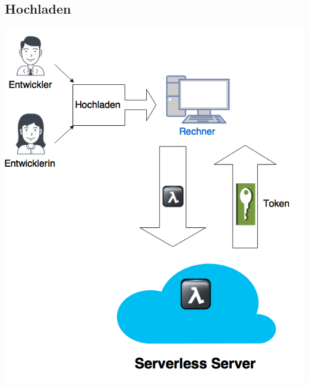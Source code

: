 \documentclass[a4paper,20pt,oneside]{book}
\begin{document}
\subsection{Hochladen}
\hspace{1cm}
\begin{center}
\includegraphics[width=13 cm]{Hochladen.png}
\end{center}

\pagebreak
\end{document}
